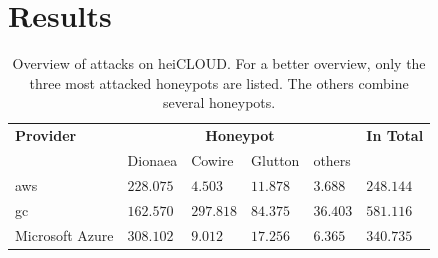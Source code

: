 \begin{table}
\begin{tabularx}{\linewidth}{l|XlX}
        \bottomrule
    \end{tabularx}
    \label{tab:overview-honeypots}
\end{table}

\section{Results}
\label{sec:honeypots-heicloud}

\begin{table}
    \centering
    \caption[Overview of attacks on heiCLOUD]{Overview of attacks on heiCLOUD. For a better overview, only the three most attacked honeypots are listed. The others combine several honeypots.}
    \begin{tabular}{l|llll|l}
        \toprule
        \textbf{Provider} & \multicolumn{4}{c|}{\textbf{Honeypot}} & \textbf{In Total}                                   \\
                          & Dionaea                                & Cowire            & Glutton  & others   &           \\
        \hline
        \acl{aws}         & $228.075$                              & $4.503$           & $11.878$ & $3.688$  & $248.144$ \\
        \acl{gc}          & $162.570$                              & $297.818$         & $84.375$ & $36.403$ & $581.116$ \\
        Microsoft Azure   & $308.102$                              & $9.012$           & $17.256$ & $6.365$  & $340.735$ \\
        \bottomrule
    \end{tabular}
    \label{tab:overview-cloud-security}
\end{table}

